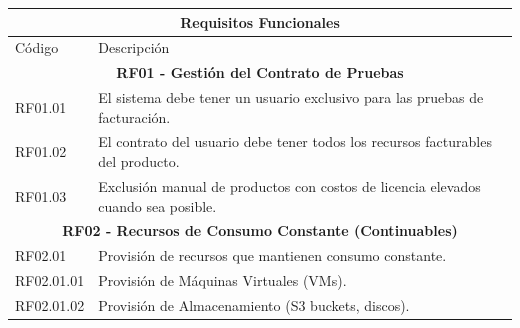 \begin{table}[htbp]
    \centering
    \begin{tabular}{|p{}|p{}|}
        \hline
        \multicolumn{2}{|c|}{\textbf{Requisitos Funcionales}}                                                                                                                                             \\
        \hline
        \hline
        Código     & Descripción                                                                                                                                                                          \\
        \hline
        \multicolumn{2}{|c|}{\textbf{RF01 - Gestión del Contrato de Pruebas}}                                                                                                                             \\
        \hline
        RF01.01    & El sistema debe tener un usuario exclusivo para las pruebas de facturación.                                                                                                          \\
        \hline
        RF01.02    & El contrato del usuario debe tener todos los recursos facturables del producto.                                                                                                      \\
        \hline
        RF01.03    & Exclusión manual de productos con costos de licencia elevados cuando sea posible.                                                                                                    \\
        \hline
        \multicolumn{2}{|c|}{\textbf{RF02 - Recursos de Consumo Constante (Continuables)}}                                                                                                                \\
        \hline
        RF02.01    & Provisión de recursos que mantienen consumo constante.                                                                                                                               \\
        \hline
        RF02.01.01 & Provisión de Máquinas Virtuales (VMs).                                                                                                                                               \\
        \hline
        RF02.01.02 & Provisión de Almacenamiento (S3 buckets, discos).                                                                                                                                    \\

\end{tabular}
\end{table}
